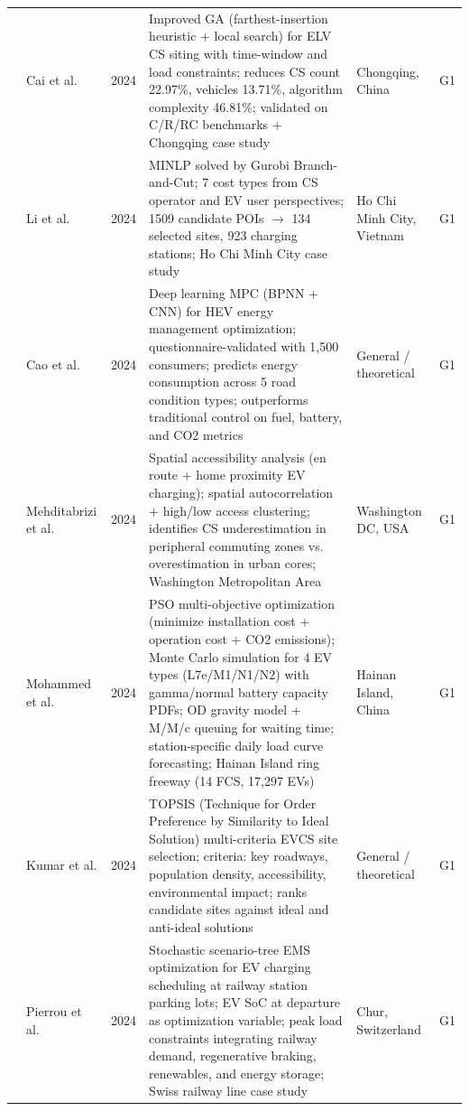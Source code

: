 \documentclass[letterpaper, 12pt, oneside, doublespacing]{Thesis}
\begin{document}
\begin{longtable}{L{0.9cm} L{2.2cm} L{0.8cm} L{3.3cm} L{2.5cm} L{1.5cm}}
\cite{charging_station_2024} & Cai et al. & 2024 & Improved GA (farthest-insertion heuristic + local search) for ELV CS siting with time-window and load constraints; reduces CS count 22.97\%, vehicles 13.71\%, algorithm complexity 46.81\%; validated on C/R/RC benchmarks + Chongqing case study & Chongqing, China & G1 \\
\cite{electric_vehicle_2024} & Li et al. & 2024 & MINLP solved by Gurobi Branch-and-Cut; 7 cost types from CS operator and EV user perspectives; 1509 candidate POIs $\rightarrow$ 134 selected sites, 923 charging stations; Ho Chi Minh City case study & Ho Chi Minh City, Vietnam & G1 \\
\cite{energy_management_2024} & Cao et al. & 2024 & Deep learning MPC (BPNN + CNN) for HEV energy management optimization; questionnaire-validated with 1,500 consumers; predicts energy consumption across 5 road condition types; outperforms traditional control on fuel, battery, and CO2 metrics & General {\slash} theoretical & G1 \\
\cite{integrating_en_2024} & Mehditabrizi et al. & 2024 & Spatial accessibility analysis (en route + home proximity EV charging); spatial autocorrelation + high/low access clustering; identifies CS underestimation in peripheral commuting zones vs. overestimation in urban cores; Washington Metropolitan Area & Washington DC, USA & G1 \\
\cite{multiobjective_optimization_2024} & Mohammed et al. & 2024 & PSO multi-objective optimization (minimize installation cost + operation cost + CO2 emissions); Monte Carlo simulation for 4 EV types (L7e/M1/N1/N2) with gamma/normal battery capacity PDFs; OD gravity model + M/M/c queuing for waiting time; station-specific daily load curve forecasting; Hainan Island ring freeway (14 FCS, 17,297 EVs) & Hainan Island, China & G1 \\
\cite{optimal_electric_2024} & Kumar et al. & 2024 & TOPSIS (Technique for Order Preference by Similarity to Ideal Solution) multi-criteria EVCS site selection; criteria: key roadways, population density, accessibility, environmental impact; ranks candidate sites against ideal and anti-ideal solutions & General {\slash} theoretical & G1 \\
\cite{optimal_ev_2024} & Pierrou et al. & 2024 & Stochastic scenario-tree EMS optimization for EV charging scheduling at railway station parking lots; EV SoC at departure as optimization variable; peak load constraints integrating railway demand, regenerative braking, renewables, and energy storage; Swiss railway line case study & Chur, Switzerland & G1 \\

\end{longtable}
\end{document}
